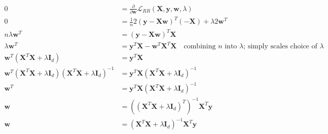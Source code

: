 \newcommand{\matrix}[1]{\mathbf{#1}}
\newcommand{\vector}[1]{\mathbf{#1}}
\newcommand{\X}{\matrix{X}}
\newcommand{\y}{\vector{y}}
\newcommand{\w}{\vector{w}}
\begin{align*}
0 &= \frac{\partial}{\partial \w} \mathcal{L}_{RR} (\X,\y,\w,\lambda) \\
0 &= \frac{1}{n} 2(\y - \X\w)^T (-\X) + \lambda 2 \w^T \\
n \lambda \w^T &= (\y - \X\w)^T \X \\
\lambda \w^T &= \y^T\X - \w^T\X^T\X \quad \text{combining } n \text { into } \lambda \text{; simply scales choice of } \lambda \\
\w^T (\X^T\X + \lambda \matrix{I}_d) &= \y^T\X \\
\w^T (\X^T\X + \lambda \matrix{I}_d) (\X^T\X + \lambda \matrix{I}_d)^{-1} &= \y^T\X (\X^T\X + \lambda \matrix{I}_d)^{-1} \\
\w^T &= \y^T\X (\X^T\X + \lambda \matrix{I}_d)^{-1} \\
\w &= ((\X^T\X + \lambda \matrix{I}_d)^T)^{-1} \X^T\y \\
\w &= (\X^T\X + \lambda \matrix{I}_d)^{-1} \X^T\y \\
\end{align*}
